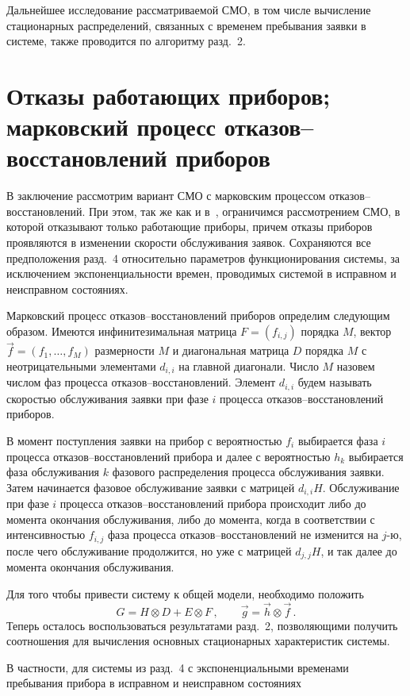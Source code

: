 \begin{multicols}{2}
Дальнейшее исследование рассматриваемой СМО, в том числе вычисление
стационарных распределений, связанных с временем пребывания заявки
в системе, также проводится по алгоритму разд.~2.

\section{Отказы работающих приборов;
марковский процесс отказов--восстановлений приборов}

В заключение рассмотрим вариант СМО с марковским процессом
от\-ка\-зов--вос\-ста\-нов\-ле\-ний.
При этом, так же как и в~\cite{PSCh06}, ограничимся рассмотрением СМО,
в которой отказывают только работающие приборы, причем отказы
приборов проявляются в изменении скорости обслуживания заявок.
Сохраняются все предположения разд.~4 относительно параметров
функционирования системы, за исключением экспоненциальности времен,
проводимых системой в исправном и неисправном состояниях.

Марковский процесс отказов--восстановлений приборов определим следующим
образом.
Имеются инфинитезимальная матрица $F=(f_{i,j})$ порядка $M$, вектор
$\vec f=(f_1,\ldots,f_M)$ размерности $M$ и диагональная матрица $D$
порядка $M$ с неотрицательными элементами $d_{i,i}$ на главной диагонали.
Число $M$ назовем числом фаз процесса отказов--восстановлений.
Элемент $d_{i,i}$ будем называть скоростью обслуживания заявки при
фазе $i$ процесса отказов--восстановлений приборов.

В момент поступления заявки на прибор с вероятностью $f_i$ выбирается
фаза $i$ процесса отказов--восстановлений прибора и далее с вероятностью
$h_k$ выбирается фаза обслуживания $k$ фазового распределения
процесса обслуживания заявки.
Затем начинается фазовое обслуживание заявки с матрицей $d_{i,i}H$.
Обслуживание при фазе $i$ процесса отказов--восстановлений прибора
происходит либо до момента окончания обслуживания, либо до момента,
когда в соответствии с интенсивностью $f_{i,j}$ фаза
процесса отказов--восстановлений не изменится на $j$-ю,
после чего обслуживание продолжится, но уже с матрицей $d_{j,j}H$,
и так далее до момента окончания обслуживания.


Для того чтобы привести систему к общей модели, необходимо положить
$$
G =
H \otimes D + E \otimes F\,,\qquad
\vec g =
\vec h \otimes \vec f\,.
$$
Теперь осталось воспользоваться результатами разд.~2, позволяющими
получить соотношения для вычисления основных стационарных характеристик
системы.

В частности, для системы из разд.~4 с экспоненциальными временами
пребывания
прибора в исправном и неисправном состояниях


\end{multicols}
